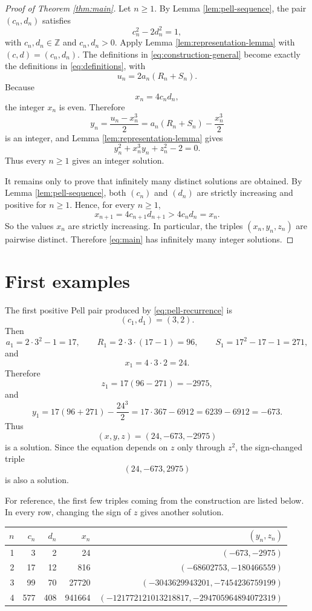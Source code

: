 \documentclass[11pt]{article}
\numberwithin{equation}{section}
\theoremstyle{remark}
\begin{document}
\begin{proof}[Proof of Theorem \ref{thm:main}]
Let \(n\ge 1\).  By Lemma \ref{lem:pell-sequence}, the pair \((c_n,d_n)\) satisfies
\[
    c_n^2-2d_n^2=1,
\]
with \(c_n,d_n\in\mathbb Z\) and \(c_n,d_n>0\).  Apply Lemma \ref{lem:representation-lemma} with \((c,d)=(c_n,d_n)\).  The definitions in \eqref{eq:construction-general} become exactly the definitions in \eqref{eq:definitions}, with
\[
    u_n=2a_n(R_n+S_n).
\]
Because
\[
    x_n=4c_nd_n,
\]
the integer \(x_n\) is even.  Therefore
\[
    y_n=\frac{u_n-x_n^3}{2}
    =a_n(R_n+S_n)-\frac{x_n^3}{2}
\]
is an integer, and Lemma \ref{lem:representation-lemma} gives
\[
    y_n^2+x_n^3y_n+z_n^2-2=0.
\]
Thus every \(n\ge 1\) gives an integer solution.

It remains only to prove that infinitely many distinct solutions are obtained.  By Lemma \ref{lem:pell-sequence}, both \((c_n)\) and \((d_n)\) are strictly increasing and positive for \(n\ge 1\).  Hence, for every \(n\ge 1\),
\[
    x_{n+1}=4c_{n+1}d_{n+1}>4c_nd_n=x_n.
\]
So the values \(x_n\) are strictly increasing.  In particular, the triples \((x_n,y_n,z_n)\) are pairwise distinct.  Therefore \eqref{eq:main} has infinitely many integer solutions.
\end{proof}

\section{First examples}

The first positive Pell pair produced by \eqref{eq:pell-recurrence} is
\[
    (c_1,d_1)=(3,2).
\]
Then
\[
    a_1=2\cdot 3^2-1=17,
    \qquad
    R_1=2\cdot 3\cdot(17-1)=96,
    \qquad
    S_1=17^2-17-1=271,
\]
and
\[
    x_1=4\cdot 3\cdot 2=24.
\]
Therefore
\[
    z_1=17(96-271)=-2975,
\]
and
\[
    y_1=17(96+271)-\frac{24^3}{2}
       =17\cdot 367-6912
       =6239-6912
       =-673.
\]
Thus
\[
    (x,y,z)=(24,-673,-2975)
\]
is a solution.  Since the equation depends on \(z\) only through \(z^2\), the sign-changed triple
\[
    (24,-673,2975)
\]
is also a solution.

For reference, the first few triples coming from the construction are listed below.  In every row, changing the sign of \(z\) gives another solution.

\begin{center}
\begin{tabular}{rrrrr}
\toprule
\(n\) & \(c_n\) & \(d_n\) & \(x_n\) & \((y_n,z_n)\) \\
\midrule
1 & 3 & 2 & 24 & \((-673,-2975)\) \\
2 & 17 & 12 & 816 & \((-68602753,-180466559)\) \\
3 & 99 & 70 & 27720 & \((-3043629943201,-7454236759199)\) \\
4 & 577 & 408 & 941664 & \((-121772121013218817,-294705964894072319)\) \\
\bottomrule
\end{tabular}
\end{center}
\end{document}

